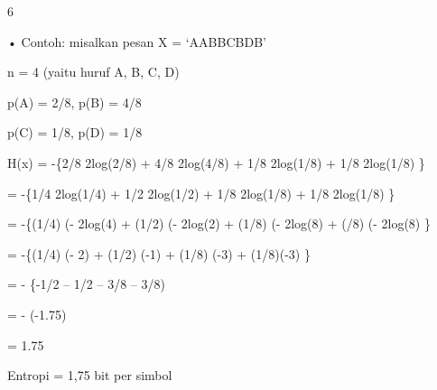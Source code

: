 \documentclass{article}
\begin{document}

6

• Contoh: misalkan pesan X = ‘AABBCBDB’


   n = 4  (yaitu huruf A, B, C, D)


   p(A) = 2/8, p(B) = 4/8


   p(C) = 1/8, p(D) = 1/8 


   H(x) = -\{2/8 2log(2/8) + 4/8 2log(4/8) + 1/8 2log(1/8) + 1/8 2log(1/8) \}

            = -\{1/4 2log(1/4) + 1/2 2log(1/2) + 1/8 2log(1/8) + 1/8 2log(1/8) \}

            = -\{(1/4) (- 2log(4) + (1/2) (- 2log(2) + (1/8) (- 2log(8)  + (/8) (- 2log(8) \}

            = -\{(1/4) (- 2) + (1/2) (-1) + (1/8) (-3) + (1/8)(-3) \}

            = - \{-1/2 – 1/2 – 3/8 – 3/8)

            = - (-1.75)

            = 1.75

    Entropi = 1,75 bit per simbol
\end{document}
